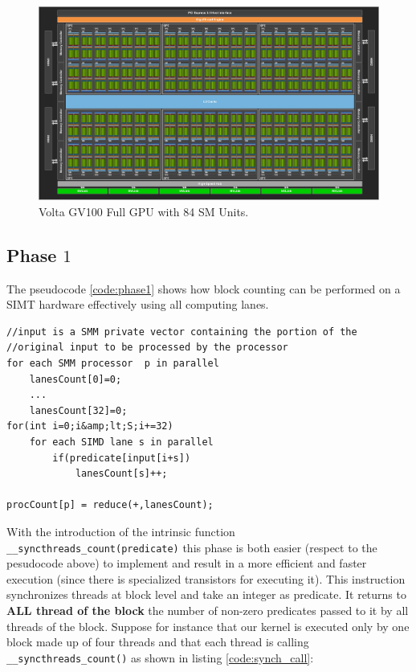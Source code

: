 \begin{figure}
	\begin{center}
		\includegraphics[width=1.0\textwidth]{./images/stream_compaction/volta_architecture}
		\caption{ Volta GV100 Full GPU with 84 SM Units.}
		\label{fig:volta_architecture}
	\end{center}
\end{figure}

\subsection{Phase $1$}
The  pseudocode \ref{code:phase1} shows how block counting can be performed on a SIMT hardware effectively using all computing lanes.
\begin{lstlisting}
//input is a SMM private vector containing the portion of the //original input to be processed by the processor
for each SMM processor  p in parallel
	lanesCount[0]=0;
	...
	lanesCount[32]=0;
for(int i=0;i&amp;lt;S;i+=32)
	for each SIMD lane s in parallel
		if(predicate[input[i+s])
			lanesCount[s]++;

procCount[p] = reduce(+,lanesCount);	
\end{lstlisting}

With the introduction of the intrinsic function \texttt{\_\_syncthreads\_count(predicate)} this phase is both easier (respect to the pesudocode above) to implement and result in a more efficient and faster execution (since there is specialized transistors for executing it). This instruction synchronizes threads at block level and take an integer as predicate. It returns to \textbf{ALL thread of the block} the number of non-zero predicates passed to it by all threads of the block.
Suppose for instance that our kernel is executed only by one block made up of four threads and that each thread is calling \texttt{\_\_syncthreads\_count()} as shown in listing \ref{code:synch_call}:

